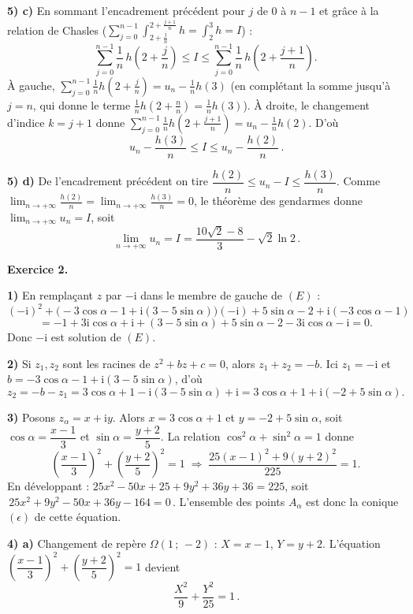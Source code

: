 \noindent\textbf{5) c)} En sommant l'encadrement précédent pour $j$ de $0$ à $n-1$ et grâce à la
relation de Chasles ($\sum_{j=0}^{n-1}\int_{2+\frac jn}^{2+\frac{j+1}{n}}h=\int_2^3 h=I$) :
\[
\sum_{j=0}^{n-1}\frac1n\,h\!\left(2+\frac jn\right)\le I\le\sum_{j=0}^{n-1}\frac1n\,h\!\left(2+\frac{j+1}{n}\right).
\]
À gauche, $\displaystyle\sum_{j=0}^{n-1}\frac1n h\!\left(2+\frac jn\right)=u_n-\frac1n h(3)$
(en complétant la somme jusqu'à $j=n$, qui donne le terme $\tfrac1n h(2+\tfrac nn)=\tfrac1n h(3)$).
À droite, le changement d'indice $k=j+1$ donne
$\displaystyle\sum_{j=0}^{n-1}\frac1n h\!\left(2+\frac{j+1}{n}\right)=u_n-\frac1n h(2)$. D'où
\[
\boxed{\,u_n-\frac{h(3)}{n}\le I\le u_n-\frac{h(2)}{n}\,}.
\]

\noindent\textbf{5) d)} De l'encadrement précédent on tire
$\dfrac{h(2)}{n}\le u_n-I\le\dfrac{h(3)}{n}$. Comme
$\displaystyle\lim_{n\to+\infty}\frac{h(2)}{n}=\lim_{n\to+\infty}\frac{h(3)}{n}=0$, le théorème des
gendarmes donne $\displaystyle\lim_{n\to+\infty}u_n=I$, soit
\[
\boxed{\,\lim_{n\to+\infty}u_n=I=\frac{10\sqrt2-8}{3}-\sqrt2\ln2\,}.
\]

\bigskip
\noindent\textbf{Exercice 2.}

\noindent\textbf{1)} En remplaçant $z$ par $-\mathrm i$ dans le membre de gauche de $(E)$ :
\[
(-\mathrm i)^2+\bigl(-3\cos\alpha-1+\mathrm i(3-5\sin\alpha)\bigr)(-\mathrm i)+5\sin\alpha-2+\mathrm i(-3\cos\alpha-1)
\]
\[
=-1+3\mathrm i\cos\alpha+\mathrm i+(3-5\sin\alpha)+5\sin\alpha-2-3\mathrm i\cos\alpha-\mathrm i=0.
\]
Donc $-\mathrm i$ est solution de $(E)$.

\noindent\textbf{2)} Si $z_1,z_2$ sont les racines de $z^2+bz+c=0$, alors $z_1+z_2=-b$. Ici
$z_1=-\mathrm i$ et $b=-3\cos\alpha-1+\mathrm i(3-5\sin\alpha)$, d'où
\[
z_2=-b-z_1=3\cos\alpha+1-\mathrm i(3-5\sin\alpha)+\mathrm i=3\cos\alpha+1+\mathrm i(-2+5\sin\alpha).
\]

\noindent\textbf{3)} Posons $z_\alpha=x+\mathrm iy$. Alors $x=3\cos\alpha+1$ et $y=-2+5\sin\alpha$,
soit $\cos\alpha=\dfrac{x-1}{3}$ et $\sin\alpha=\dfrac{y+2}{5}$. La relation
$\cos^2\alpha+\sin^2\alpha=1$ donne
\[
\left(\frac{x-1}{3}\right)^2+\left(\frac{y+2}{5}\right)^2=1
\;\Longrightarrow\;
\frac{25(x-1)^2+9(y+2)^2}{225}=1.
\]
En développant : $25x^2-50x+25+9y^2+36y+36=225$, soit
$\boxed{\,25x^2+9y^2-50x+36y-164=0\,}$. L'ensemble des points $A_\alpha$ est donc la conique
$(\epsilon)$ de cette équation.

\noindent\textbf{4) a)} Changement de repère $\Omega(1\,;\,-2)$ : $X=x-1$, $Y=y+2$. L'équation
$\left(\dfrac{x-1}{3}\right)^2+\left(\dfrac{y+2}{5}\right)^2=1$ devient
\[
\boxed{\,\frac{X^2}{9}+\frac{Y^2}{25}=1\,}.
\]

